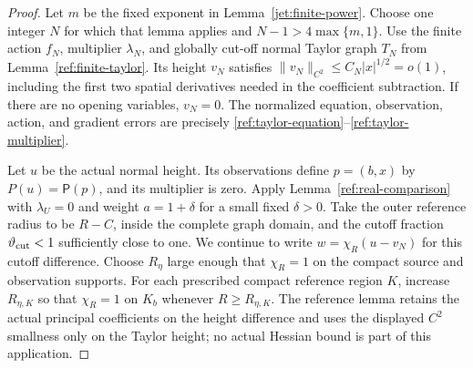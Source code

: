 \begin{proof}
Let $m$ be the fixed exponent in Lemma~\ref{jet:finite-power}.  Choose
one integer $N$ for which that lemma applies and
$N-1>4\max\{m,1\}$.  Use the finite action $f_N$, multiplier
$\lambda_N$, and globally cut-off normal Taylor graph $T_N$ from
Lemma~\ref{ref:finite-taylor}.  Its height $v_N$ satisfies
$\|v_N\|_{C^2}\le C_N|x|^{1/2}=o(1)$, including the first two spatial
derivatives needed in the coefficient subtraction.  If there are no
opening variables, $v_N=0$.  The normalized equation, observation,
action, and gradient errors are precisely
\eqref{ref:taylor-equation}--\eqref{ref:taylor-multiplier}.

Let $u$ be the actual normal height.  Its observations define $p=(b,x)$
by $P(u)=\mathsf P(p)$, and its multiplier is zero.  Apply
Lemma~\ref{ref:real-comparison} with $\lambda_U=0$ and weight
$a=1+\delta$ for a small fixed $\delta>0$.  Take the outer reference
radius to be $R-C$, inside the complete graph domain, and the cutoff
fraction $\vartheta_{\rm cut}<1$ sufficiently close to one.  We continue
to write $w=\chi_R(u-v_N)$ for this cutoff difference.  Choose $R_\eta$
large enough that $\chi_R=1$ on the compact source and observation
supports.  For each prescribed compact reference region $K$, increase
$R_{\eta,K}$ so that $\chi_R=1$ on $K_b$ whenever $R\ge R_{\eta,K}$.
The reference lemma retains the actual principal coefficients on the
height difference and uses the displayed $C^2$ smallness only on the
Taylor height; no actual Hessian bound is part of this application.


\end{proof}
